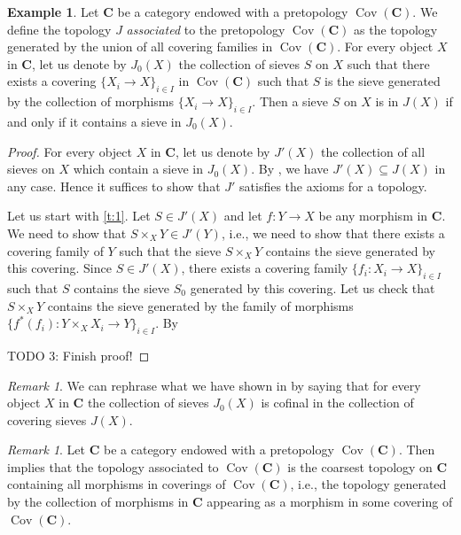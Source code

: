 \documentclass[12pt,reqno,a4paper]{amsart}
\theoremstyle{plain}
\theoremstyle{definition}
\newtheorem{exmp}[thm]{Example}
\theoremstyle{remark}
\newtheorem{rem}[thm]{Remark}
\begin{document}
\begin{exmp}\label{exmp:associated}
  Let $\mathbf{C}$ be a category endowed with a pretopology $\operatorname{Cov}(\mathbf{C})$.
  We define the topology $J$ \textit{associated} to the pretopology $\operatorname{Cov}(\mathbf{C})$ as the topology generated by the union of all covering families in $\operatorname{Cov}(\mathbf{C})$.
  For every object $X$ in $\mathbf{C}$, let us denote by $J_{0}(X)$ the collection of sieves $S$ on $X$ such that there exists a covering $\{ X_{i} \to X\}_{i \in I}$ in $\operatorname{Cov}(\mathbf{C})$ such that $S$ is the sieve generated by the collection of morphisms $\{ X_{i} \to X \}_{i \in I}$.
  Then a sieve $S$ on $X$ is in $J(X)$ if and only if it contains a sieve in $J_{0}(X)$.
  \begin{proof}
    For every object $X$ in $\mathbf{C}$, let us denote by $J'(X)$ the collection of all sieves on $X$ which contain a sieve in $J_{0}(X)$.
    By , we have $J'(X) \subseteq J(X)$ in any case.
    Hence it suffices to show that $J'$ satisfies the axioms for a topology.

    Let us start with \ref{t:1}.
    Let $S \in J'(X)$ and let $f \colon Y \to X$ be any morphism in $\mathbf{C}$.
    We need to show that $S \times_{X} Y \in J'(Y)$, i.e., we need to show that there exists a covering family of $Y$ such that the sieve $S \times_{X} Y$ contains the sieve generated by this covering.
    Since $S \in J'(X)$, there exists a covering family $\{ f_{i} \colon X_{i} \to X \}_{i \in I}$ such that $S$ contains the sieve $S_{0}$ generated by this covering.
    Let us check that $S \times_{X} Y$ contains the sieve generated by the family of morphisms $\{ f^{*}(f_{i}) \colon Y \times_{X} X_{i} \to Y \}_{i \in I}$.
    By 

    {\color{red} TODO 3: Finish proof!}
  \end{proof}
\end{exmp}

\begin{rem}\label{rem:cofinal}
  We can rephrase what we have shown in  by saying that for every object $X$ in $\mathbf{C}$ the collection of sieves $J_{0}(X)$ is cofinal in the collection of covering sieves $J(X)$.
\end{rem}

\begin{rem}\label{rem:associated}
  Let $\mathbf{C}$ be a category endowed with a pretopology $\operatorname{Cov}(\mathbf{C})$.
  Then  implies that the topology associated to $\operatorname{Cov}(\mathbf{C})$ is the coarsest topology on $\mathbf{C}$ containing all morphisms in coverings of $\operatorname{Cov}(\mathbf{C})$, i.e., the topology generated by the collection of morphisms in $\mathbf{C}$ appearing as a morphism in some covering of $\operatorname{Cov}(\mathbf{C})$.
\end{rem}
\end{document}
